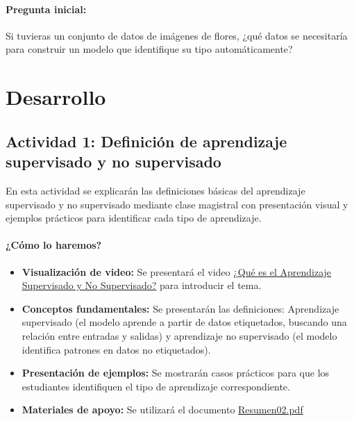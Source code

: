 \documentclass[a4,11pt]{aleph-notas}
\begin{document}
\paragraph{Pregunta inicial:}
Si tuvieras un conjunto de datos de imágenes de flores, ¿qué datos se necesitaría para construir un modelo que identifique su tipo automáticamente?

\section*{Desarrollo}


\subsection*{Actividad 1: Definición de aprendizaje supervisado y no supervisado}

En esta actividad se explicarán las definiciones básicas del aprendizaje supervisado y no supervisado mediante clase magistral con presentación visual y ejemplos prácticos para identificar cada tipo de aprendizaje.

\paragraph{¿Cómo lo haremos?}
\begin{itemize}[leftmargin=*]
    \item \textbf{Visualización de video:}
    Se presentará el video \href{https://youtu.be/oT3arRRB2Cw?si=ot9JjoIYtF3NWvun}{¿Qué es el Aprendizaje Supervisado y No Supervisado?} para introducir el tema.
    \item \textbf{Conceptos fundamentales:}
    Se presentarán las definiciones: Aprendizaje supervisado (el modelo aprende a partir de datos etiquetados, buscando una relación entre entradas y salidas) y aprendizaje no supervisado (el modelo identifica patrones en datos no etiquetados).
    \item \textbf{Presentación de ejemplos:}
    Se mostrarán casos prácticos para que los estudiantes identifiquen el tipo de aprendizaje correspondiente.
    \item \textbf{Materiales de apoyo:}
    Se utilizará el documento \href{https://andres-merino.github.io/AprendizajeAutomaticoInicial-05-N0105/2-Resumenes/Resumen02.pdf}{Resumen02.pdf}


\end{itemize}
\end{document}
